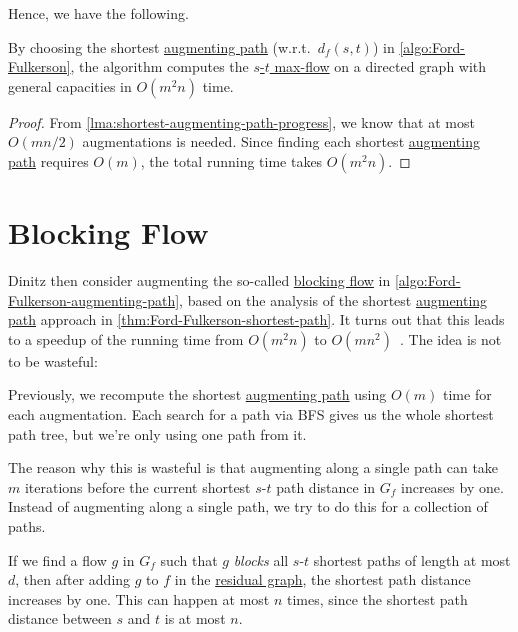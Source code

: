 Hence, we have the following.

\begin{theorem}\label{thm:Ford-Fulkerson-shortest-path}
	By choosing the shortest \hyperref[def:augmenting-path]{augmenting path} (w.r.t.\ \(d_f(s, t)\)) in \autoref{algo:Ford-Fulkerson}, the algorithm computes the \hyperref[prb:s-t-max-flow]{\(s\)-\(t\) max-flow} on a directed graph with general capacities in \(O(m^2 n)\) time.
\end{theorem}
\begin{proof}
	From \autoref{lma:shortest-augmenting-path-progress}, we know that at most \(O(mn / 2)\) augmentations is needed. Since finding each shortest \hyperref[def:augmenting-path]{augmenting path} requires \(O(m)\), the total running time takes \(O(m^2 n)\).
\end{proof}

\section{Blocking Flow}
Dinitz then consider augmenting the so-called \hyperref[def:blocking-flow]{blocking flow} in \autoref{algo:Ford-Fulkerson-augmenting-path}, based on the analysis of the shortest \hyperref[def:augmenting-path]{augmenting path} approach in \autoref{thm:Ford-Fulkerson-shortest-path}. It turns out that this leads to a speedup of the running time from \(O(m^2 n)\) to \(O(mn^2)\)~\cite{karzanov1973finding,dinic1970algorithm,goldberg1998beyond}. The idea is not to be wasteful:

\begin{prev}
	Previously, we recompute the shortest \hyperref[def:augmenting-path]{augmenting path} using \(O(m)\) time for each augmentation. Each search for a path via BFS gives us the whole shortest path tree, but we're only using one path from it.
\end{prev}

The reason why this is wasteful is that augmenting along a single path can take \(m\) iterations before the current shortest \(s\)-\(t\) path distance in \(G_f\) increases by one. Instead of augmenting along a single path, we try to do this for a collection of paths.

\begin{intuition}
	If we find a flow \(g\) in \(G_f\) such that \(g\) \emph{blocks} all \(s\)-\(t\) shortest paths of length at most \(d\), then after adding \(g\) to \(f\) in the \hyperref[def:residual-graph]{residual graph}, the shortest path distance increases by one. This can happen at most \(n\) times, since the shortest path distance between \(s\) and \(t\) is at most \(n\).
\end{intuition}


